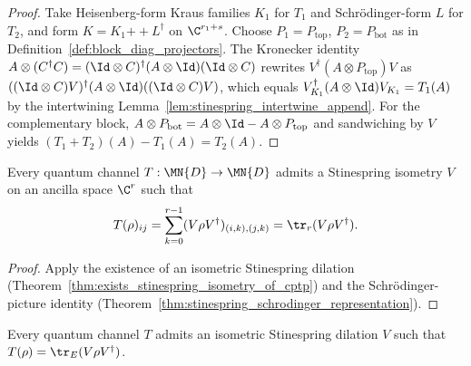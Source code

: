 \begin{proof}\leanok
    Take Heisenberg-form Kraus families $K_1$ for $T_1$ and
    Schr\"odinger-form $L$ for $T_2$, and form $K = K_1 \mathbin{+\!+} L^\dagger$
    on $\C^{r_1 + s}$. Choose $P_1 = P_{\mathrm{top}}$, $P_2 = P_{\mathrm{bot}}$
    as in Definition~\ref{def:block_diag_projectors}. The Kronecker
    identity $A \otimes (C^\dagger C) = (\Id \otimes C)^\dagger (A \otimes \Id)
        (\Id \otimes C)$ rewrites $V^\dagger (A \otimes P_{\mathrm{top}}) V$ as
    $((\Id \otimes C) V)^\dagger (A \otimes \Id) ((\Id \otimes C) V)$,
    which equals $V_{K_1}^\dagger (A \otimes \Id) V_{K_1} = T_1(A)$ by
    the intertwining Lemma~\ref{lem:stinespring_intertwine_append}. For the
    complementary block, $A \otimes P_{\mathrm{bot}} = A \otimes \Id -
        A \otimes P_{\mathrm{top}}$ and sandwiching by $V$ yields
    $(T_1 + T_2)(A) - T_1(A) = T_2(A)$.
\end{proof}

\begin{theorem}
    \label{thm:channel_exists_stinespring_open_system}
    \leanok
    Every quantum channel $T : \MN{D} \to \MN{D}$ admits a Stinespring
    isometry $V$ on an ancilla space $\C^r$ such that
    \[
        T(\rho)_{ij} = \sum_{k=0}^{r-1} (V \rho V^\dagger)_{(i,k),(j,k)}
        = \tr_r(V \rho V^\dagger).
    \]
\end{theorem}

\begin{proof}\leanok
    Apply the existence of an isometric Stinespring dilation
    (Theorem~\ref{thm:exists_stinespring_isometry_of_cptp}) and the
    Schr\"odinger-picture identity
    (Theorem~\ref{thm:stinespring_schrodinger_representation}).
\end{proof}

\begin{theorem}
    \label{thm:channel_exists_stinespring_open_system_traceRight}
    \leanok
    Every quantum channel $T$ admits an isometric Stinespring dilation
    $V$ such that $T(\rho) = \tr_E(V \rho V^\dagger)$.
\end{theorem}


